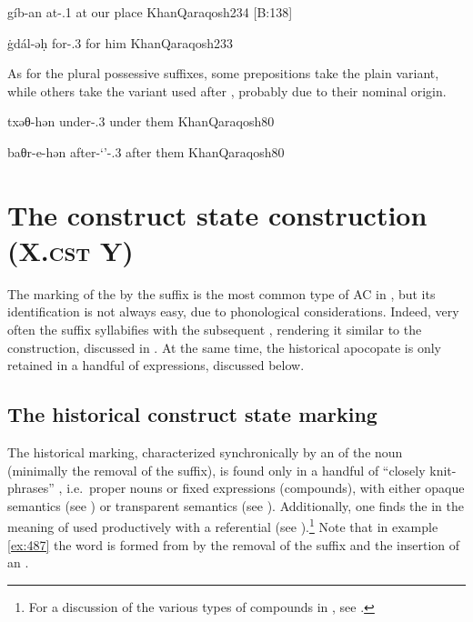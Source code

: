 {gíb-an}
{at-\poss.1\pl}
{at our place}
{KhanQaraqosh}{234 {[B:138]}}

{ġdál-əḥ}
{for-\poss.3\masc}
{for him}
{KhanQaraqosh}{233}

As for the plural possessive suffixes, some prepositions take the plain variant, while others take the variant used after {\pl*} \prims, probably due to their nominal origin.

{txəθ-hən}
{under-\poss.3\pl}
{under them}
{KhanQaraqosh}{80}

{baθr-e-hən}
{after-\enquote*{\pl}-\poss.3\pl}
{after them}
{KhanQaraqosh}{80}

\section{The construct state construction (X.\textsc{cst} Y)} \label{ss:Qar_CSC}


The marking of the \prim by the \cst* suffix \ed  is the most common type of AC in \Qar, but its identification is not always easy, due to phonological considerations. Indeed, very often the \cst* suffix syllabifies with the subsequent \secn, rendering it similar to the \lnk* construction, discussed in . At the same time, the historical apocopate \cst* is only retained in a handful of expressions, discussed below.

\subsection{The historical construct state marking} \label{ss:Qar_hist_cst}

The historical \cst* marking, characterized synchronically by an  of the \prim noun  (minimally the removal of the \free*  suffix),
is found only in a handful of \enquote{closely knit-phrases} \citep[209]{KhanQaraqosh}, i.e.\ proper nouns or fixed expressions (compounds), with either opaque semantics (see ) or transparent semantics (see ). Additionally, one finds the \prim {} in the meaning of  used productively with a referential \secn (see ).\footnote{For a discussion of the various types of compounds in , see \citet{GutmanCompounds}.} Note that in example \ref{ex:487} the word  is formed from  by the removal of the \free*  suffix  and the insertion of an  .

